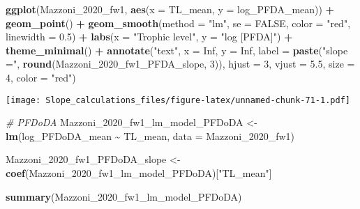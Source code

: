 \documentclass[
]{article}
\newenvironment{Shaded}{\begin{snugshade}}{\end{snugshade}}
\newcommand{\AttributeTok}[1]{\textcolor[rgb]{0.13,0.29,0.53}{#1}}
\newcommand{\CommentTok}[1]{\textcolor[rgb]{0.56,0.35,0.01}{\textit{#1}}}
\newcommand{\ConstantTok}[1]{\textcolor[rgb]{0.56,0.35,0.01}{#1}}
\newcommand{\DecValTok}[1]{\textcolor[rgb]{0.00,0.00,0.81}{#1}}
\newcommand{\FloatTok}[1]{\textcolor[rgb]{0.00,0.00,0.81}{#1}}
\newcommand{\FunctionTok}[1]{\textcolor[rgb]{0.13,0.29,0.53}{\textbf{#1}}}
\newcommand{\NormalTok}[1]{#1}
\newcommand{\OtherTok}[1]{\textcolor[rgb]{0.56,0.35,0.01}{#1}}
\newcommand{\SpecialCharTok}[1]{\textcolor[rgb]{0.81,0.36,0.00}{\textbf{#1}}}
\newcommand{\StringTok}[1]{\textcolor[rgb]{0.31,0.60,0.02}{#1}}
\begin{document}
\begin{Shaded}
\begin{Highlighting}[]
\FunctionTok{ggplot}\NormalTok{(Mazzoni\_2020\_fw1, }\FunctionTok{aes}\NormalTok{(}\AttributeTok{x =}\NormalTok{ TL\_mean, }\AttributeTok{y =}\NormalTok{ log\_PFDA\_mean)) }\SpecialCharTok{+}
  \FunctionTok{geom\_point}\NormalTok{() }\SpecialCharTok{+}
  \FunctionTok{geom\_smooth}\NormalTok{(}\AttributeTok{method =} \StringTok{"lm"}\NormalTok{, }\AttributeTok{se =} \ConstantTok{FALSE}\NormalTok{, }\AttributeTok{color =} \StringTok{"red"}\NormalTok{, }\AttributeTok{linewidth =} \FloatTok{0.5}\NormalTok{) }\SpecialCharTok{+}
  \FunctionTok{labs}\NormalTok{(}\AttributeTok{x =} \StringTok{"Trophic level"}\NormalTok{,}
       \AttributeTok{y =} \StringTok{"log [PFDA]"}\NormalTok{) }\SpecialCharTok{+}
  \FunctionTok{theme\_minimal}\NormalTok{() }\SpecialCharTok{+}
  \FunctionTok{annotate}\NormalTok{(}\StringTok{"text"}\NormalTok{, }\AttributeTok{x =} \ConstantTok{Inf}\NormalTok{, }\AttributeTok{y =} \ConstantTok{Inf}\NormalTok{, }\AttributeTok{label =} \FunctionTok{paste}\NormalTok{(}\StringTok{"slope ="}\NormalTok{, }\FunctionTok{round}\NormalTok{(Mazzoni\_2020\_fw1\_PFDA\_slope, }\DecValTok{3}\NormalTok{)), }
           \AttributeTok{hjust =} \DecValTok{3}\NormalTok{, }\AttributeTok{vjust =} \FloatTok{5.5}\NormalTok{, }\AttributeTok{size =} \DecValTok{4}\NormalTok{, }\AttributeTok{color =} \StringTok{"red"}\NormalTok{)}
\end{Highlighting}
\end{Shaded}

\texttt{[image: Slope\_calculations\_files/figure-latex/unnamed-chunk-71-1.pdf]}

\begin{Shaded}
\begin{Highlighting}[]
\CommentTok{\# PFDoDA}
\NormalTok{Mazzoni\_2020\_fw1\_lm\_model\_PFDoDA }\OtherTok{\textless{}{-}} \FunctionTok{lm}\NormalTok{(log\_PFDoDA\_mean }\SpecialCharTok{\textasciitilde{}}\NormalTok{ TL\_mean,}
                                      \AttributeTok{data =}\NormalTok{ Mazzoni\_2020\_fw1)}

\NormalTok{Mazzoni\_2020\_fw1\_PFDoDA\_slope }\OtherTok{\textless{}{-}} \FunctionTok{coef}\NormalTok{(Mazzoni\_2020\_fw1\_lm\_model\_PFDoDA)[}\StringTok{"TL\_mean"}\NormalTok{]}

\FunctionTok{summary}\NormalTok{(Mazzoni\_2020\_fw1\_lm\_model\_PFDoDA)}
\end{Highlighting}
\end{Shaded}
\end{document}
